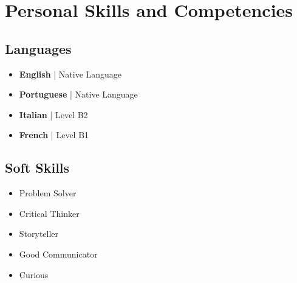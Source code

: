 \documentclass[10pt,a4paper,sans]{moderncv}        %
\begin{document}
\vspace{-1em}
\section{Personal Skills and Competencies}
\vspace{-0.75em}
\subsection{Languages}
\vspace{-1.25em}
\begin{multicols}{2}
\begin{itemize}
\item \textbf{English} \hspace{1.51em}   | Native Language 
\item \textbf{Portuguese}   | Native Language
\item \textbf{Italian} \hspace{-0.12em}  | Level B2 
\item \textbf{French}  | Level B1
\end{itemize}
\end{multicols}

\vspace{-0.75em}
\subsection{Soft Skills}
\vspace{-1.25em}
\begin{multicols}{2}
\begin{itemize}
\item Problem Solver
\item Critical Thinker
\item Storyteller
\item Good Communicator 
\item Curious
\end{itemize}
\end{multicols}

\vspace{-0.75em}
\end{document}
